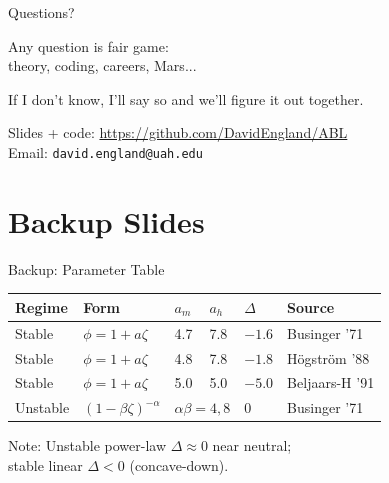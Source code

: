 \documentclass[10pt,aspectratio=169]{beamer}
\begin{document}
\begin{frame}[standout]
  \Huge Questions?
  
  \vspace{1cm}
  \normalsize
  Any question is fair game:\\
  theory, coding, careers, Mars...
  
  \vspace{0.5cm}
  \alert{If I don't know, I'll say so and we'll figure it out together.}
  
  \vspace{0.8cm}
  \small
  Slides + code: \url{https://github.com/DavidEngland/ABL}\\
  Email: \texttt{david.england@uah.edu}
\end{frame}

\appendix
\section{Backup Slides}

\begin{frame}{Backup: Parameter Table}
  \begin{table}
    \centering
    \small
    \begin{tabular}{llllll}
      \toprule
      \textbf{Regime} & \textbf{Form} & $a_m$ & $a_h$ & $\Delta$ & \textbf{Source} \\
      \midrule
      Stable & $\phi = 1 + a\zeta$ & 4.7 & 7.8 & $-1.6$ & Businger '71 \\
      Stable & $\phi = 1 + a\zeta$ & 4.8 & 7.8 & $-1.8$ & Högström '88 \\
      Stable & $\phi = 1 + a\zeta$ & 5.0 & 5.0 & $-5.0$ & Beljaars-H '91 \\
      Unstable & $(1-\beta\zeta)^{-\alpha}$ & \multicolumn{2}{c}{$\alpha\beta=4,8$} & 0 & Businger '71 \\
      \bottomrule
    \end{tabular}
  \end{table}
  
  \vspace{0.3cm}
  \alert{Note:} Unstable power-law $\Delta \approx 0$ near neutral;\\
  stable linear $\Delta < 0$ (concave-down).
\end{frame}
\end{document}
